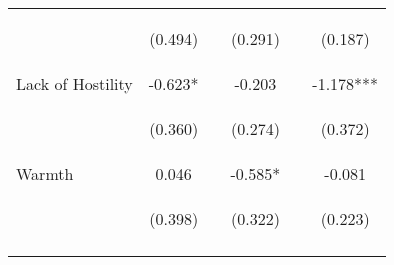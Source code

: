\begin{tabular}{lccccc}
 & \begin{footnotesize}(0.494)\end{footnotesize} & \begin{footnotesize}\end{footnotesize} & \begin{footnotesize}(0.291)\end{footnotesize} & \begin{footnotesize}\end{footnotesize} & \begin{footnotesize}(0.187)\end{footnotesize}\\
\noalign{\smallskip}Lack of Hostility & -0.623* &  & -0.203 &  & -1.178***\\
 & \begin{footnotesize}(0.360)\end{footnotesize} & \begin{footnotesize}\end{footnotesize} & \begin{footnotesize}(0.274)\end{footnotesize} & \begin{footnotesize}\end{footnotesize} & \begin{footnotesize}(0.372)\end{footnotesize}\\
\noalign{\smallskip}Warmth & 0.046 &  & -0.585* &  & -0.081\\
 & \begin{footnotesize}(0.398)\end{footnotesize} & \begin{footnotesize}\end{footnotesize} & \begin{footnotesize}(0.322)\end{footnotesize} & \begin{footnotesize}\end{footnotesize} & \begin{footnotesize}(0.223)\end{footnotesize}\\
\noalign{\smallskip}\hline\end{tabular}\\
